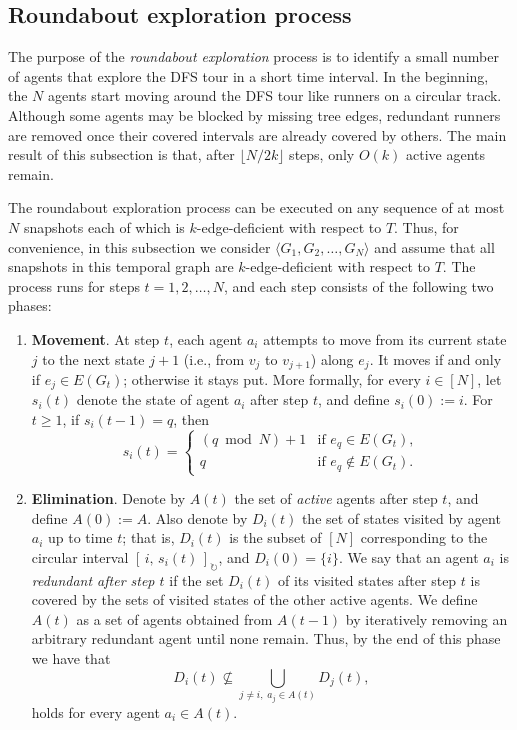 \documentclass[a4paper,11pt]{article}
\theoremstyle{definition}
\theoremstyle{remark}
\newcommand{\cint}[2]{[\,#1,\,#2\,]_{\circlearrowright}}
\begin{document}
	\subsection{Roundabout exploration process}\label{sec:roundabout-exploration}
    The purpose of the \emph{roundabout exploration} process is to identify a small number of agents that explore the DFS tour in a short time interval.
    In the beginning, the $N$ agents start moving around the DFS tour like runners on a circular track. Although some agents may be blocked by missing tree edges, redundant runners are removed once their covered intervals are already covered by others.
    The main result of this subsection is that, after $\lfloor N/2k\rfloor$ steps, only
    $O(k)$ active agents remain.
    
    The roundabout exploration process can be executed on any sequence of at most $N$ snapshots each of which is
    $k$-edge-deficient with respect to $T$. Thus, for convenience, in this subsection we consider
    $\langle G_1,G_2,\ldots,G_N\rangle$ and assume that all snapshots in this temporal graph are
    $k$-edge-deficient with respect to $T$. The process runs for steps
    $t=1,2,\ldots,N$, and each step consists of the following two phases:
	\begin{enumerate}
		\item \textbf{Movement}. At step $t$, each agent $a_i$ attempts to move from its current state $j$ to the next state $j+1$ (i.e., from $v_j$ to $v_{j+1}$) along $e_j$.	It moves if and only if $e_j \in E(G_t)$; otherwise it stays put.
		More formally, for every $i \in [N]$, let $s_i(t)$ denote the state of agent $a_i$ after step $t$, and define $s_i(0) := i$. For $t \geq 1$, if $s_i(t-1) = q$, then
		\[
		s_i(t)=
		\begin{cases}
			(q \bmod N) + 1 & \text{if } e_q \in E(G_t),\\
			q   & \text{if } e_q\notin E(G_t).
		\end{cases}
		\]
		
		\item \textbf{Elimination}. Denote by $A(t)$ the set of \emph{active} agents after step $t$, and define $A(0) := A$.
		Also denote by $D_i(t)$ the set of states visited by agent $a_i$ up to time $t$; that is, $D_i(t)$ is the subset of $[N]$ corresponding to the circular interval
		$\cint{i}{s_i(t)}$, and $D_i(0) = \{i\}$.
		We say that an agent $a_i$  is \textit{redundant after step $t$} if the set $D_i(t)$ of its visited states after step $t$ is covered by the sets of visited states of the other active agents. We define $A(t)$ as a set of agents obtained from $A(t-1)$ by iteratively removing an arbitrary redundant agent until none remain. Thus, by the end of this phase we have that
		\[
			D_i(t) \not\subseteq \bigcup_{j \neq i,\; a_j \in A(t)} D_j(t),
		\]
		holds for every agent $a_i \in A(t)$.
	\end{enumerate}
	
\end{document}
